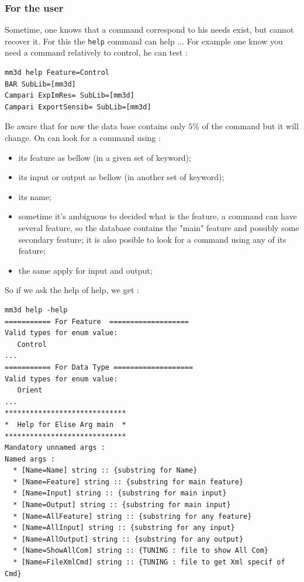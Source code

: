 \subsubsection{For the user}

Sometime, one knows that a command correspond to his needs exist, but cannot 
recover it. For this the {\tt help} command can help ... For example  one
know you need a command relatively to control, he can test :

\begin{verbatim}
mm3d help Feature=Control
BAR SubLib=[mm3d]
Campari ExpImRes= SubLib=[mm3d]
Campari ExportSensib= SubLib=[mm3d]
\end{verbatim}

Be aware that for now the data base contains only $5\%$ of the command
but it will change. On can look for a command using :

\begin{itemize}
   \item its feature as bellow (in a given set of keyword);
   \item its input or output as bellow (in another set of keyword);
   \item its name;

   \item sometime it's ambiguous to decided what is the feature, a 
         command can have several feature, so the database contains the
         "main" feature and possibly some secondary feature; 
         it is also posible to look for a command using any of its feature;
   
   \item the same apply for input and output;
\end{itemize}

So if we ask the help of help, we get :

\begin{verbatim}
mm3d help -help
=========== For Feature  ===================
Valid types for enum value: 
   Control
...
=========== For Data Type ===================
Valid types for enum value: 
   Orient
...
*****************************
*  Help for Elise Arg main  *
*****************************
Mandatory unnamed args : 
Named args : 
  * [Name=Name] string :: {substring for Name}
  * [Name=Feature] string :: {substring for main feature}
  * [Name=Input] string :: {substring for main input}
  * [Name=Output] string :: {substring for main input}
  * [Name=AllFeature] string :: {substring for any feature}
  * [Name=AllInput] string :: {substring for any input}
  * [Name=AllOutput] string :: {substring for any output}
  * [Name=ShowAllCom] string :: {TUNING : file to show All Com}
  * [Name=FileXmlCmd] string :: {TUNING : file to get Xml specif of Cmd}
\end{verbatim}

